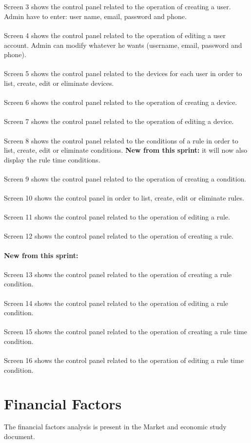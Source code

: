 \documentclass[11pt,a4paper]{article}
\begin{document}
\begin{itemize}
\\ \\
Screen 3 shows the control panel related to the operation of creating a user. Admin have to enter: user name, email, password and phone.
\\ \\
Screen 4 shows the control panel related to the operation of editing a user account. Admin can modify whatever he wants (username, email, password and phone). 
\\ \\
Screen 5 shows the control panel related to the devices for each user in order to list, create, edit or eliminate devices. 
\\ \\
Screen 6 shows the control panel related to the operation of creating a device.
\\ \\
Screen 7 shows the control panel related to the operation of editing a device.
\\ \\
Screen 8 shows the control panel related to the conditions of a rule in order to list, create, edit or eliminate conditions. \textbf{New from this sprint:} it will now also display the rule time conditions.
\\ \\
Screen 9 shows the control panel related to the operation of creating a condition.
\\ \\
Screen 10 shows the control panel in order to list, create, edit or eliminate rules.
\\ \\
Screen 11 shows the control panel related to the operation of editing a rule.
\\ \\
Screen 12 shows the control panel related to the operation of creating a rule.
\\ \\
\textbf{New from this sprint:}
\\ \\
Screen 13 shows the control panel related to the operation of creating a rule condition.
\\ \\
Screen 14 shows the control panel related to the operation of editing a rule condition.
\\ \\
Screen 15 shows the control panel related to the operation of creating a rule time condition.
\\ \\
Screen 16 shows the control panel related to the operation of editing a rule time condition.

\end{itemize}
\section{Financial Factors}
The financial factors analysis is present in the Market and economic study document.
\end{document}
